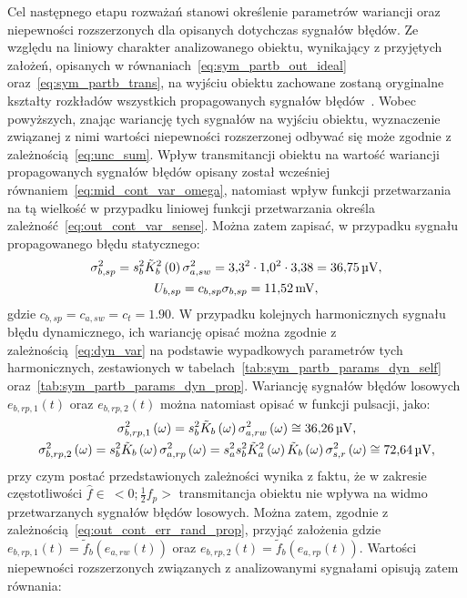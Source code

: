 Cel następnego etapu rozważań stanowi określenie parametrów wariancji oraz niepewności rozszerzonych dla opisanych dotychczas sygnałów błędów. Ze względu na liniowy charakter analizowanego obiektu, wynikający z przyjętych założeń, opisanych w równaniach~\eqref{eq:sym_partb_out_ideal} oraz~\eqref{eq:sym_partb_trans}, na wyjściu obiektu zachowane zostaną oryginalne kształty rozkładów wszystkich propagowanych sygnałów błędów~\cite{grimmett_probability}. Wobec powyższych, znając wariancję tych sygnałów na wyjściu obiektu, wyznaczenie związanej z nimi wartości niepewności rozszerzonej odbywać się może zgodnie z zależnością~\eqref{eq:unc_sum}. Wpływ transmitancji obiektu na wartość wariancji propagowanych sygnałów błędów opisany został wcześniej równaniem~\eqref{eq:mid_cont_var_omega}, natomiast wpływ funkcji przetwarzania na tą wielkość w przypadku liniowej funkcji przetwarzania określa zależność~\eqref{eq:out_cont_var_sense}. Można zatem zapisać, w przypadku sygnału propagowanego błędu statycznego:
\begin{gather}
\sigma_{b,sp}^{2} = s_{b}^{2} \tilde{K}_{b}^{2} \left(0\right) \sigma_{a,sw}^{2} = \num{3.3}^{2} \cdot \num{1.0}^{2} \cdot \num{3.38} = \qty{36.75}{\micro V} \label{eq:sym_partb_var_stat_prop}, \\
U_{b,sp} = c_{b,sp} \sigma_{b,sp} = \qty{11.52}{mV} \label{eq:sym_partb_unc_stat_prop},
\end{gather}
gdzie $c_{b,sp} = c_{a,sw} = c_{t} = \num{1.90}$. W przypadku kolejnych harmonicznych sygnału błędu dynamicznego, ich wariancję opisać można zgodnie z zależnością~\eqref{eq:dyn_var} na podstawie wypadkowych parametrów tych harmonicznych, zestawionych w tabelach~\ref{tab:sym_partb_params_dyn_self} oraz~\ref{tab:sym_partb_params_dyn_prop}. Wariancję sygnałów błędów losowych $e_{b,rp,1}(t)$ oraz $e_{b,rp,2}(t)$ można natomiast opisać w funkcji pulsacji, jako:
\begin{gather}
\sigma_{b,rp,1}^{2} \left(\omega\right) = s_{b}^{2} \tilde{K}_{b} \left(\omega\right) \sigma_{a,rw}^{2} \left(\omega\right) \cong \qty{36.26}{\micro V} \label{eq:sym_partb_var_rand_prop_1}, \\
\sigma_{b,rp,2}^{2} \left(\omega\right) = s_{b}^{2} \tilde{K}_{b} \left(\omega\right) \sigma_{a,rp}^{2} \left(\omega\right) = s_{a}^{2} s_{b}^{2} \tilde{K}_{a}^{2} \left(\omega\right) \tilde{K}_{b} \left(\omega\right) \sigma_{s,r}^{2} \left(\omega\right) \cong \qty{72.64}{\micro V} \label{eq:sym_partb_var_rand_prop_2},
\end{gather}
przy czym postać przedstawionych zależności wynika z faktu, że w zakresie częstotliwości $\hat{f} \in~<0;\frac{1}{2} f_{p}>$ transmitancja obiektu nie wpływa na widmo przetwarzanych sygnałów błędów losowych. Można zatem, zgodnie z zależnością~\eqref{eq:out_cont_err_rand_prop}, przyjąć założenia gdzie $e_{b,rp,1}(t) = \tilde{f}_{b}(e_{a,rw}(t))$ oraz $e_{b,rp,2}(t) = \tilde{f}_{b}(e_{a,rp}(t))$. Wartości niepewności rozszerzonych związanych z analizowanymi sygnałami opisują zatem równania:
